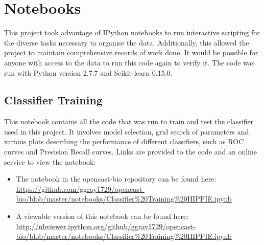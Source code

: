 \appendix
\chapter{Notebooks}

This project took advantage of IPython notebooks to run interactive scripting for the diverse tasks necessary to organise the data.
Additionally, this allowed the project to maintain comprehensive records of work done.
It would be possible for anyone with access to the data to run this code again to verify it.
The code was run with Python version 2.7.7 and Scikit-learn 0.15.0.

\section{Classifier Training}
\label{app:classtrain}

This notebook contains all the code that was run to train and test the classifier used in this project.
It involves model selection, grid search of parameters and various plots describing the performance of different classifiers, such as ROC curves and Precision Recall curves.
Links are provided to the code and an online service to view the notebook:

\begin{itemize}
    \item The notebook in the opencast-bio repository can be found here: \url{https://github.com/ggray1729/opencast-bio/blob/master/notebooks/Classifier%20Training%20HIPPIE.ipynb}
    \item A viewable version of this notebook can be found here: \url{http://nbviewer.ipython.org/github/ggray1729/opencast-bio/blob/master/notebooks/Classifier%20Training%20HIPPIE.ipynb}
\end{itemize}



\lipsum[10-20]


